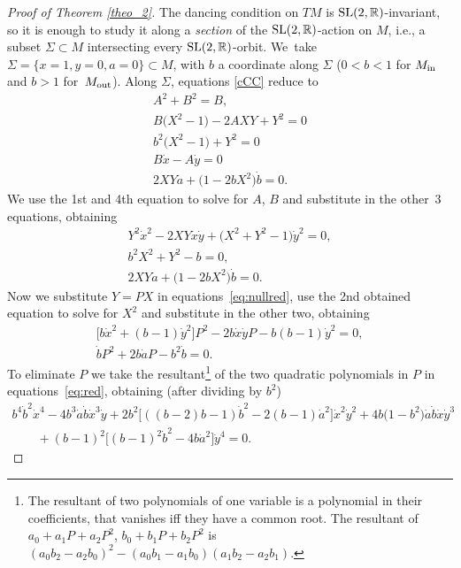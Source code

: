 \documentclass[pdftex]{sigma}%
\numberwithin{equation}{section}
\newcommand{\R}{\mathbb{R}}
\begin{document}
\begin{proof}[Proof of Theorem \ref{theo_2}]
The dancing condition on $TM$ is ${\rm SL}(2, \R)$-invariant, so it is enough to study it along a {\em section} of the
${\rm SL}(2, \R)$-action on $M$, i.e., a subset $\Sigma\subset M$ intersecting every
${\rm SL}(2, \R)$-orbit. We~take $\Sigma=\{x=1, y=0, a=0\}\subset M$, with $b$ a coordinate along $\Sigma$ ($0<b<1$ for $M_{\rm in}$ and $b>1$ for~$M_{\rm out}$). Along $\Sigma$, equations \eqref{cCC} reduce to
\begin{gather*}%
A^2+B^2=B, \\
B \big(X^2-1\big)-2 A XY+Y^2=0 \\
b^2 \big(X^2-1\big) +Y^2=0 \\
 B\dot x- A \dot y=0 \\
2X Y\dot a+\big(1-2 b X^2\big)\dot b =0.
 \end{gather*}
We use the 1st and 4th equation to solve for $A$, $B$ and substitute in the other~3 equations, obtaining
%
\begin{gather}
Y^2 \dot x^2- 2 X Y{\dot x} {\dot y} + \big(X^2+Y^2-1\big){\dot y}^2= 0, \nonumber
\\
b^2 X^2+Y^2-b =0, \nonumber
\\
2 X Y {\dot a} + \big(1-2 b X^2\big){\dot b} = 0.
\label{eq:nullred}
\end{gather}
Now we substitute $Y=PX$ in equations~\eqref{eq:nullred}, use the 2nd obtained equation to solve for $X^2$ and substitute in the other two, obtaining
\begin{gather}
\big[b{\dot x}^2+(b-1) {\dot y}^2\big] P^2-2 b {\dot x} {\dot y}P
 -b(b-1) {\dot y}^2=0,\nonumber
 \\
 \dot b P^2+ 2 b{\dot a}P -b^2{\dot b} =0.\label{eq:red}
\end{gather}
To eliminate $P$ we take the resultant\footnote{
 The resultant of two polynomials of one variable is a polynomial in their coefficients, that vanishes iff they have a common root.
The resultant of $a_0+a_1P+a_2P^2$, $b_0+b_1P+b_2P^2$ is $(a_0b_2-a_2b_0)^2-(a_0b_1-a_1b_0)(a_1b_2-a_2b_1).$
}
of the two quadratic polynomials in $P$ in equations~\eqref{eq:red}, obtaining (after dividing by $b^2$)
\begin{gather}
 b^4 {\dot b}^2 {\dot x}^4
 -4 b^3 {\dot a} {\dot b} {\dot x}^3 {\dot y}
 +2 b^2 \big[((b-2) b-1) {\dot b}^2-2 (b-1) {\dot a}^2\big]{\dot x}^2 {\dot y}^2
 +4 b \big(1-b^2\big) {\dot a} {\dot b} {\dot x}{\dot y}^3\label{sex_gil}
 \\ \qquad
{} +(b-1)^2 \big[(b-1)^2 {\dot b}^2-4b {\dot a}^2\big]{\dot y}^4 =0.
\tag*{\qed}
\end{gather}
\renewcommand{\qed}{}
\end{proof}
\end{document}
